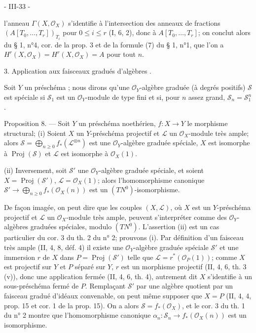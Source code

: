 \newpage


- III-33 -

l'anneau $\Gamma(X, \mathcal{O}_X)$ s'identifie à l'intersection des anneaux de fractions $(A[T_0, \dots, T_r])_{T_i}$ pour $0 \le i \le r$ (I, 6, 2), donc à $A[T_0, \dots, T_r]$; on conclut alors du § 1, n°4, cor. de la prop. 3 et de la formule (7) du § 1, n°1, que l'on a $H^r(X, \mathcal{O}_X) = H^r(X, \mathcal{O}_X) = A$ pour tout $n$.

3. Application aux faisceaux gradués d'algèbres .

Soit $Y$ un préschéma ; nous dirons qu'une $\mathcal{O}_Y$-algèbre graduée (à degrés positifs) $\mathcal{S}$ est spéciale si $\mathcal{S}_1$ est un $\mathcal{O}_Y$-module de type fini et si, pour $n$ assez grand, $\mathcal{S}_n = \mathcal{S}_1^n$.

Proposition 8. — Soit $Y$ un préschéma noethérien, $f : X \to Y$ le morphisme structural;
(i) Soient $X$ un $Y$-préschéma projectif et $\mathcal{L}$ un $\mathcal{O}_X$-module très ample; alors $\mathcal{S} = \bigoplus_{n \ge 0} f_*(\mathcal{L}^{\otimes n})$ est une $\mathcal{O}_Y$-algèbre graduée spéciale, $X$ est isomorphe à $\operatorname{Proj}(\mathcal{S})$ et $\mathcal{L}$ est isomorphe à $\mathcal{O}_{X}(1)$.

(ii) Inversement, soit $\mathcal{S}'$ une $\mathcal{O}_Y$-algèbre graduée spéciale, et soient $X = \operatorname{Proj}(\mathcal{S}')$, $\mathcal{L} = \mathcal{O}_X(1)$; alors l'homomorphisme canonique $\mathcal{S}' \to \bigoplus_{n \ge 0} f_*(\mathcal{O}_X(n))$ est un $(TN^0)$-isomorphisme.

De façon imagée, on peut dire que les couples $(X, \mathcal{L})$, où $X$ est un $Y$-préschéma projectif et $\mathcal{L}$ un $\mathcal{O}_X$-module très ample, peuvent s'interpréter comme des $\mathcal{O}_Y$-algèbres graduées spéciales, modulo $(TN^0)$. L'assertion (ii) est un cas particulier du cor. 3 du th. 2 du n° 2; prouvons (i). Par définition d'un faisceau très ample (II, 4, 8, déf. 4) il existe une $\mathcal{O}_Y$-algèbre graduée spéciale $\mathcal{S}'$ et une immersion $r$ de $X$ dans $P = \operatorname{Proj}(\mathcal{S}')$ telle que $\mathcal{L} = r^*(\mathcal{O}_P(1))$; comme $X$ est projectif sur $Y$ et $P$ séparé sur $Y$, $r$ est un morphisme projectif (II, 4, 6, th. 3 (v)), donc une application fermée (II, 4, 6, th. 4), autrement dit $X$ s'identifie à un sous-préschéma fermé de $P$. Remplaçant $\mathcal{S}'$ par une algèbre quotient par un faisceau gradué d'idéaux convenable, on peut même supposer que $X=P$ (II, 4, 4, prop. 15 et cor. 1 de la prop. 15). On a alors $\mathcal{S} = f_*(\mathcal{O}_X)$, et le cor. 3 du th. 1 du n° 2 montre que l'homomorphisme canonique $\alpha_n : \mathcal{S}_n \to f_*(\mathcal{O}_X(n))$ est un isomorphisme.

